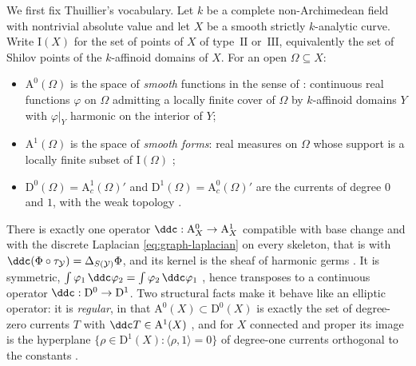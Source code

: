 We first fix Thuillier's vocabulary.  Let $k$ be a complete
non-Archimedean field with nontrivial absolute value and let $X$ be a
smooth strictly $k$-analytic curve.  Write $\mathrm I(X)$ for the set of
points of $X$ of type~$\mathrm{II}$ or~$\mathrm{III}$, equivalently the
set of Shilov points of the $k$-affinoid domains of $X$.  For an open
$\Omega\subseteq X$:
\begin{itemize}
\item $\mathrm A^0(\Omega)$ is the space of \emph{smooth} functions in the
sense of \cite[Def.~3.2.1(i)]{Thu05}: continuous real functions $\varphi$
on $\Omega$ admitting a locally finite cover of $\Omega$ by
$k$-affinoid domains $Y$ with $\varphi|_Y$ harmonic on the interior of
$Y$;
\item $\mathrm A^1(\Omega)$ is the space of \emph{smooth forms}: real
measures on $\Omega$ whose support is a locally finite subset of
$\mathrm I(\Omega)$ \cite[Def.~3.2.1(ii)]{Thu05};
\item $\mathrm D^0(\Omega)=\mathrm A^1_c(\Omega)'$ and
$\mathrm D^1(\Omega)=\mathrm A^0_c(\Omega)'$ are the currents of degree
$0$ and $1$, with the weak topology \cite[Def.~3.3.1]{Thu05}.
\end{itemize}
There is exactly one operator $\ddc:\mathrm A^0_X\to\mathrm A^1_X$
compatible with base change and with the discrete Laplacian
\eqref{eq:graph-laplacian} on every skeleton, that is with
$\ddc(\Phi\circ\tau_{\mathcal Y})=\Delta_{S(\mathcal Y)}\Phi$, and its
kernel is the sheaf of harmonic germs
\cite[Thm.~3.2.10 and Cor.~3.2.11(i)]{Thu05}.  It is symmetric,
$\int\varphi_1\,\ddc\varphi_2=\int\varphi_2\,\ddc\varphi_1$
\cite[Prop.~3.2.12]{Thu05}, hence transposes to a continuous operator
$\ddc:\mathrm D^0\to\mathrm D^1$.  Two structural facts make it behave like
an elliptic operator: it is \emph{regular}, in that
$\mathrm A^0(X)\subset\mathrm D^0(X)$ is exactly the set of degree-zero
currents $T$ with $\ddc T\in\mathrm A^1(X)$
\cite[Prop.~3.3.11]{Thu05}, and for $X$ connected and proper its image is
the hyperplane $\{\rho\in\mathrm D^1(X):\langle\rho,1\rangle=0\}$
of degree-one currents orthogonal to the constants
\cite[Thm.~3.3.13]{Thu05}.

